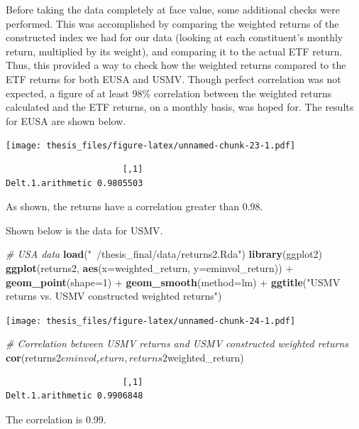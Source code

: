 \documentclass[12pt,twoside]{reedthesis}
\newenvironment{Shaded}{\begin{snugshade}}{\end{snugshade}}
\newcommand{\KeywordTok}[1]{\textcolor[rgb]{0.13,0.29,0.53}{\textbf{{#1}}}}
\newcommand{\DataTypeTok}[1]{\textcolor[rgb]{0.13,0.29,0.53}{{#1}}}
\newcommand{\DecValTok}[1]{\textcolor[rgb]{0.00,0.00,0.81}{{#1}}}
\newcommand{\StringTok}[1]{\textcolor[rgb]{0.31,0.60,0.02}{{#1}}}
\newcommand{\CommentTok}[1]{\textcolor[rgb]{0.56,0.35,0.01}{\textit{{#1}}}}
\newcommand{\NormalTok}[1]{{#1}}
\theoremstyle{definition}
\theoremstyle{definition}
\theoremstyle{definition}
\theoremstyle{remark}
\begin{document}
Before taking the data completely at face value, some additional checks
were performed. This was accomplished by comparing the weighted returns
of the constructed index we had for our data (looking at each
constituent's monthly return, multiplied by its weight), and comparing
it to the actual ETF return. Thus, this provided a way to check how the
weighted returns compared to the ETF returns for both EUSA and USMV.
Though perfect correlation was not expected, a figure of at least 98\%
correlation between the weighted returns calculated and the ETF returns,
on a monthly basis, was hoped for. The results for EUSA are shown below.

\texttt{[image: thesis\_files/figure-latex/unnamed-chunk-23-1.pdf]}
\begin{verbatim}
                       [,1]
Delt.1.arithmetic 0.9805503
\end{verbatim}
As shown, the returns have a correlation greater than 0.98.

Shown below is the data for USMV.
\begin{Shaded}
\begin{Highlighting}[]
\CommentTok{# USA data}
\KeywordTok{load}\NormalTok{(}\StringTok{"~/thesis_final/data/returns2.Rda"}\NormalTok{)}
\KeywordTok{library}\NormalTok{(ggplot2)}
\KeywordTok{ggplot}\NormalTok{(returns2, }\KeywordTok{aes}\NormalTok{(}\DataTypeTok{x=}\NormalTok{weighted_return, }\DataTypeTok{y=}\NormalTok{eminvol_return)) +}
\StringTok{    }\KeywordTok{geom_point}\NormalTok{(}\DataTypeTok{shape=}\DecValTok{1}\NormalTok{) +}\StringTok{  }\KeywordTok{geom_smooth}\NormalTok{(}\DataTypeTok{method=}\NormalTok{lm) +}\StringTok{ }\KeywordTok{ggtitle}\NormalTok{(}\StringTok{"USMV returns vs. USMV constructed weighted returns"}\NormalTok{)}
\end{Highlighting}
\end{Shaded}
\texttt{[image: thesis\_files/figure-latex/unnamed-chunk-24-1.pdf]}
\begin{Shaded}
\begin{Highlighting}[]
\CommentTok{# Correlation between USMV returns and USMV constructed weighted returns}
\KeywordTok{cor}\NormalTok{(returns2$eminvol_return, returns2$weighted_return)}
\end{Highlighting}
\end{Shaded}
\begin{verbatim}
                       [,1]
Delt.1.arithmetic 0.9906848
\end{verbatim}
The correlation is 0.99.
\end{document}
